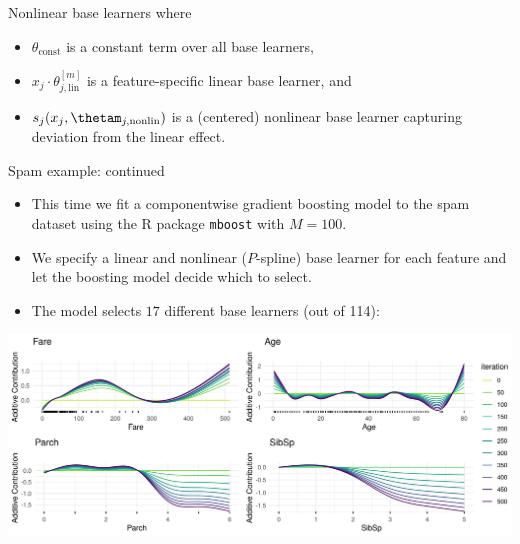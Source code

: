 \begin{vbframe}{Nonlinear base learners}
\small
where
\begin{itemize}
  \small
  \item $\theta_\text{const}$ is a constant term over all base learners,
  \item $x_j \cdot \theta^{[m]}_{j, \text{lin}}$ is a feature-specific linear 
  base learner, and
  \item $s_j(x_j, \thetam_{j,\text{nonlin}})$ is a (centered) nonlinear base 
  learner capturing deviation from the linear effect.
\end{itemize}

\end{vbframe}


\begin{vbframe}{Spam example: continued}

\begin{itemize}
  \item This time we fit a componentwise gradient boosting model to the spam 
  dataset using the R package \texttt{mboost} with $M = 100$.
  \item We specify a linear and nonlinear ($P$-spline) base learner for each 
  feature and let the boosting model decide which to select.
  \item The model selects $17$ different base learners (out of 114):
\end{itemize}

\vfill

\begin{center}
\includegraphics[width = \textwidth]{figure/compboost-illustration-3.png}
\end{center}



\end{vbframe}


